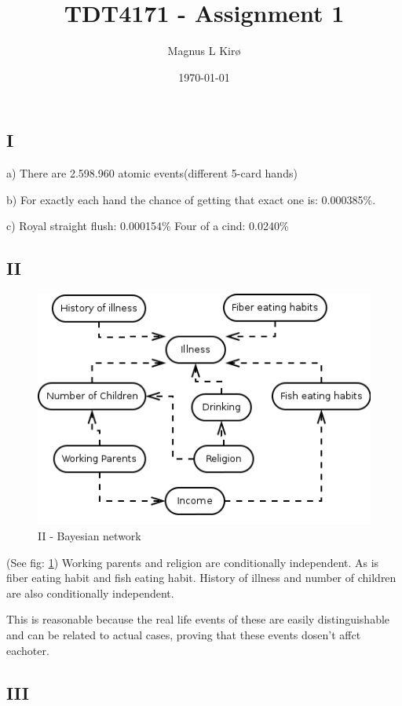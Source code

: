 \documentclass[12pt, a4paper]{article}
\title{TDT4171 - Assignment 1}
\author{
        Magnus L Kirø \\
}
\date{\today}
\begin{document}
\maketitle
{}

\subsection{I}
a) There are 2.598.960 atomic events(different 5-card hands)

b) For exactly each hand the chance of getting that exact one is: 0.000385\%.

c) 
Royal straight flush: 0.000154\%
Four of a cind: 0.0240\%

\subsection{II}
\begin{figure}[htb]
    \centering
    \includegraphics[width=\textwidth]{byesian1}
    \caption{II - Bayesian network}
    \label{II2}
\end{figure}
(See fig: \ref{II2})
Working parents and religion are conditionally independent.
As is fiber eating habit and fish eating habit. 
History of illness and number of children are also conditionally independent. 

This is reasonable because the real life events of these are easily distinguishable and can be related to actual cases, 
proving that these events dosen't affct eachoter. 

\subsection{III}
\end{document}
